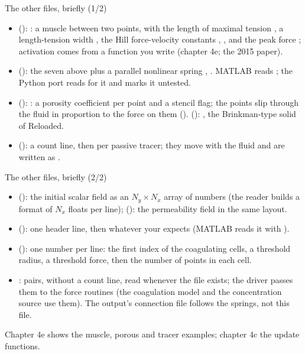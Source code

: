\documentclass[aspectratio=169,11pt]{beamer}
\begin{document}
\begin{frame}{The other files, briefly (1/2)}
\label{fr:others}
\small
\begin{itemize}
  \item {} (): : a muscle between two points, with the length of maximal tension , a length-tension width , the Hill force-velocity constants , , and the peak force ; activation comes from a function you write (chapter 4e; the 2015 paper).
  \item {} (): the seven above plus a parallel nonlinear spring , . MATLAB reads ; the Python port reads  for it and marks it untested.
  \item {} (): : a porosity coefficient per point and a stencil flag; the points slip through the fluid in proportion to the force on them ().  (): , the Brinkman-type solid of Reloaded.
  \item {} (): a count line, then  per passive tracer; they move with the fluid and are written as .
\end{itemize}
\end{frame}

\begin{frame}{The other files, briefly (2/2)}
\label{fr:others2}
\small
\begin{itemize}
  \item {} (): the initial scalar field as an $N_y \times N_x$ array of numbers (the reader builds a format of $N_x$ floats per line);  (): the permeability field in the same layout.
  \item {} (): one header line, then whatever your  expects (MATLAB reads it with ).
  \item {} (): one number per line: the first index of the coagulating cells, a threshold radius, a threshold force, then the number of points in each cell.
  \item {}:  pairs, without a count line, read whenever the file exists; the driver passes them to the force routines (the coagulation model and the concentration source use them). The output's connection file follows the springs, not this file.
\end{itemize}
Chapter 4e shows the muscle, porous and tracer examples; chapter 4c the update functions.
\end{frame}
\end{document}
